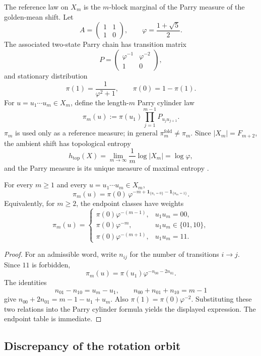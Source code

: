The reference law on \(X_m\) is the \(m\)-block marginal of the Parry measure
of the golden-mean shift.  Let
\[
A=\begin{pmatrix}1&1\\1&0\end{pmatrix},\qquad
\varphi=\frac{1+\sqrt5}{2}.
\]
The associated two-state Parry chain has transition matrix
\[
P=\begin{pmatrix}\varphi^{-1} & \varphi^{-2}\\ 1&0\end{pmatrix},
\]
and stationary distribution
\[
\pi(1)=\frac{1}{\varphi^2+1},\qquad
\pi(0)=1-\pi(1).
\]
For $u=u_1\cdots u_m\in X_m$, define the length-$m$ Parry cylinder law
\[
\pi_m(u):=\pi(u_1)\prod_{j=1}^{m-1}P_{u_j u_{j+1}}.
\]
\(\pi_m\) is used only as a reference measure; in general
\(\pi_m^{\mathrm{fold}}\ne\pi_m\).  Since \(|X_m|=F_{m+2}\), the ambient
shift has topological entropy
\[
h_{\mathrm{top}}(X)=\lim_{m\to\infty}\frac1m\log |X_m|=\log\varphi,
\]
and the Parry measure is its unique measure of maximal entropy
\cite{LindMarcus1995,WaltersErgodicTheory}.

\begin{proposition}\label{prop:parry-endpoint-collapse}
For every \(m\ge1\) and every \(u=u_1\cdots u_m\in X_m\),
\[
\pi_m(u)=
\pi(0)\,\varphi^{-m+\mathbf{1}_{\{u_1=0\}}-\mathbf{1}_{\{u_m=1\}}}.
\]
Equivalently, for \(m\ge2\), the endpoint classes have weights
\[
\pi_m(u)=
\begin{cases}
\pi(0)\varphi^{-(m-1)}, & u_1u_m=00,\\
\pi(0)\varphi^{-m}, & u_1u_m\in\{01,10\},\\
\pi(0)\varphi^{-(m+1)}, & u_1u_m=11.
\end{cases}
\]
\end{proposition}

\begin{proof}
For an admissible word, write \(n_{ij}\) for the number of transitions
\(i\to j\). Since \(11\) is forbidden,
\[
\pi_m(u)=\pi(u_1)\varphi^{-n_{00}-2n_{01}}.
\]
The identities
\[
n_{01}-n_{10}=u_m-u_1,
\qquad
n_{00}+n_{01}+n_{10}=m-1
\]
give \(n_{00}+2n_{01}=m-1-u_1+u_m\). Also
\(\pi(1)=\pi(0)\varphi^{-2}\). Substituting these two relations into the
Parry cylinder formula yields the displayed expression. The endpoint table is
immediate.
\end{proof}

\subsection{Discrepancy of the rotation orbit}

